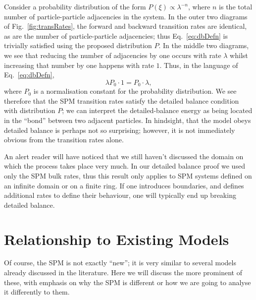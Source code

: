 Consider a probability distribution of the form $P(\xi) \propto \lambda^{-n}$, where $n$ is the total
number of particle-particle adjacencies in the system. In the outer two diagrams of 
Fig.~\ref{fig:transRates}, the forward and backward transition rates are identical, as are the number of
particle-particle adjacencies; thus Eq.~\ref{eq:dbDefn} is trivially satisfied using the proposed 
distribution $P$. In the middle two diagrams, we see that reducing the number of adjacencies by one
occurs with rate $\lambda$ whilst increasing that number by one happens with rate $1$. Thus, in the 
language of Eq.~\ref{eq:dbDefn},
\begin{equation}
 \lambda P_0 \cdot 1 = P_0 \cdot \lambda,
\end{equation}
where $P_0$ is a normalisation constant for the probability distribution. We see therefore that the SPM
transition rates satisfy the detailed balance condition with distribution $P$; we can interpret the 
detailed-balance energy as being located in the ``bond'' between two adjacent particles. In hindsight,
that the model obeys detailed balance is perhaps not so surprising; however, it is not immediately 
obvious from the transition rates alone.

An alert reader will have noticed that we still haven't discussed the domain on which the process takes 
place very much. In our detailed balance proof we used only the SPM bulk rates, thus this result only
applies to SPM systems defined on an infinite domain or on a finite ring. If one introduces boundaries,
and defines additional rates to define their behaviour, one will typically end up breaking detailed 
balance.

\section{Relationship to Existing Models} \label{sec:existingModels}
Of course, the SPM is not exactly ``new''; it is very similar to several models already discussed in the
literature. Here we will discuss the more prominent of these, with emphasis on why the SPM is different or
how we are going to analyse it differently to them.
